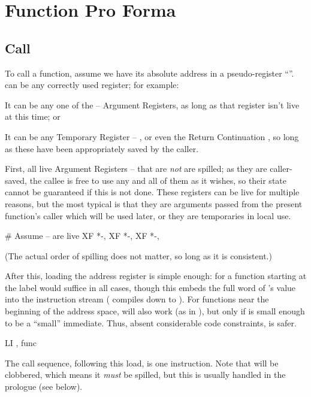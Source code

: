 \chapter{Function {\chapterit Pro Forma}}

\section{Call}

To call a function, assume we have its absolute address in a pseudo-register
``''.  can be any correctly used register; for example:

\li It can be any one of the  --  Argument Registers, as long
as that register isn't live at this time; or

\li It can be any Temporary Register  -- , or even the Return
Continuation , so long as these have been appropriately saved by the
caller.

First, all live Argument Registers  --  that are {\it not}
 are spilled; as they are caller-saved, the callee is free to use any
and all of them as it wishes, so their state cannot be guaranteed if this is
not done. These registers can be live for multiple reasons, but the most
typical is that they are arguments passed from the present function's caller
which will be used later, or they are temporaries in local use.

\startblock
	\# Assume  --  are live
	XF *-, 
	XF *-, 
	XF *-, 
\endblock

(The actual order of spilling does not matter, so long as it is consistent.)

After this, loading the address register is simple enough:  for a function starting at the label  would suffice in all
cases, though this embeds the full word of 's value into the
instruction stream ( compiles down to ).
For functions near the beginning of the address space,  will also work
(as in ), but only if  is small enough to be
a ``small'' immediate. Thus, absent considerable code constraints,  is
safer.

\startblock
	LI , func
\endblock

The call sequence, following this load, is one instruction. Note that 
will be clobbered, which means it {\it must} be spilled, but this is usually
handled in the prologue (see below).

